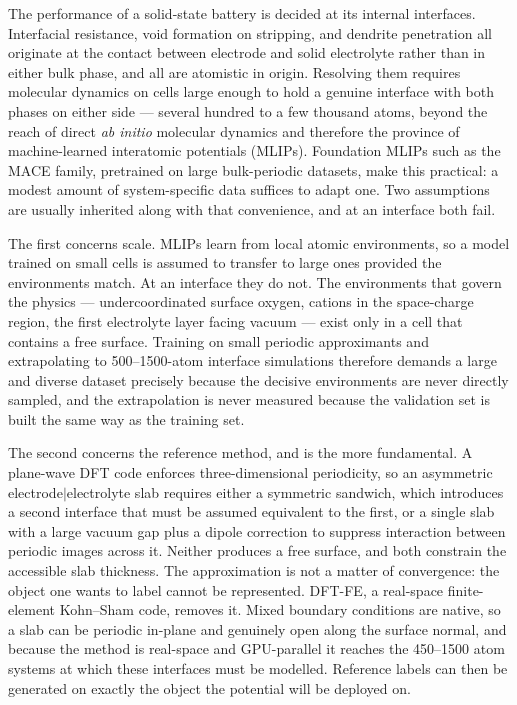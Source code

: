 \documentclass[11pt]{article}
\begin{document}
The performance of a solid-state battery is decided at its internal interfaces.
Interfacial resistance, void formation on stripping, and dendrite penetration
all originate at the contact between electrode and solid electrolyte rather
than in either bulk phase, and all are atomistic in origin. Resolving them
requires molecular dynamics on cells large enough to hold a genuine interface
with both phases on either side --- several hundred to a few thousand atoms,
beyond the reach of direct \emph{ab initio} molecular dynamics and therefore
the province of machine-learned interatomic potentials (MLIPs). Foundation
MLIPs such as the MACE family, pretrained on large bulk-periodic
datasets\citep{batatia2023mace,omat24}, make this practical: a modest amount of
system-specific data suffices to adapt one. Two assumptions are usually
inherited along with that convenience, and at an interface both fail.

The first concerns scale. MLIPs learn from local atomic environments, so a
model trained on small cells is assumed to transfer to large ones provided the
environments match. At an interface they do not. The environments that govern
the physics --- undercoordinated surface oxygen, cations in the space-charge
region, the first electrolyte layer facing vacuum --- exist only in a cell that
contains a free surface. Training on small periodic approximants and
extrapolating to 500--1500-atom interface simulations therefore demands a large
and diverse dataset precisely because the decisive environments are never
directly sampled, and the extrapolation is never measured because the
validation set is built the same way as the training set.

The second concerns the reference method, and is the more fundamental. A
plane-wave DFT code enforces three-dimensional periodicity, so an asymmetric
electrode$|$electrolyte slab requires either a symmetric sandwich, which
introduces a second interface that must be assumed equivalent to the first, or
a single slab with a large vacuum gap plus a dipole correction to suppress
interaction between periodic images across it. Neither produces a free surface,
and both constrain the accessible slab thickness. The approximation is not a
matter of convergence: the object one wants to label cannot be represented.
DFT-FE, a real-space finite-element Kohn--Sham code\citep{dftfe,Das2022},
removes it. Mixed boundary conditions are native, so a slab can be periodic
in-plane and genuinely open along the surface normal, and because the method is
real-space and GPU-parallel it reaches the 450--1500 atom systems at which
these interfaces must be modelled. Reference labels can then be generated on
exactly the object the potential will be deployed on.
\end{document}
